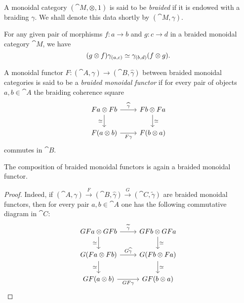 \documentclass[../../deep-dive]{subfiles}
\begin{document}
\begin{definition}
    \label{def:braided-monoidal-category}
    A monoidal category \((\cat M, \otimes, 1)\) is said to be \emph{braided} if it
    is endowed with a braiding \(\gamma\). We shall denote this data shortly by
    \((\cat M, \gamma)\).
\end{definition}

\begin{corollary}
    \label{cor:braiding-morphisms}
    For any given pair of morphisms \(f: a \to b\) and \(g: c \to d\) in a braided
    monoidal category \(\cat M\), we have
    \[
        (g \otimes f) \gamma_{(a, c)} \simeq \gamma_{(b, d)} (f \otimes g).
    \]
\end{corollary}

\begin{definition}
    \label{def:braided-monoidal-functor}
    A monoidal functor \(F: (\cat A, \gamma) \to (\cat B, \widehat \gamma)\) between
    braided monoidal categories is said to be a \emph{braided monoidal functor} if
    for every pair of objects \(a, b \in \cat A\) the braiding coherence square
    \[
        \begin{tikzcd}
            F a \otimes F b \ar[r, "\widehat\gamma"] \ar[d, "\dis"']
            &F b \otimes F a \ar[d, "\dis"] \\
            F (a \otimes b) \ar[r, "F \gamma"'] &F (b \otimes a)
        \end{tikzcd}
    \]
    commutes in \(\cat B\).
\end{definition}

\begin{corollary}
    \label{cor:composition-of-braided-monoidal-functors}
    The composition of braided monoidal functors is again a braided monoidal
    functor.
\end{corollary}

\begin{proof}
    Indeed, if
    \((\cat A, \gamma) \xrightarrow F (\cat B, \widehat \gamma) \xrightarrow G (\cat
    C, \widetilde \gamma)\) are braided monoidal functors, then for every pair
    \(a, b \in \cat A\) one has the following commutative diagram in \(\cat C\):
    \[
        \begin{tikzcd}
            G F a \otimes G F b
            \ar[r, "\widetilde \gamma"]
            \ar[d, "\dis"']
            &GF b \otimes GF a
            \ar[d, "\dis"]
            \\
            G(F a \otimes F b)
            \ar[r, "G \widehat \gamma"]
            \ar[d, "\dis"']
            &G (F b \otimes F a)
            \ar[d, "\dis"]
            \\
            GF (a \otimes b)
            \ar[r, "G F \gamma"']
            &GF (b \otimes a)
        \end{tikzcd}
    \]
\end{proof}
\end{document}
